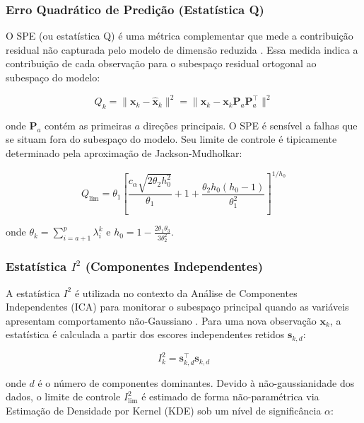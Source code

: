 \documentclass[journal]{IEEEtran}
\begin{document}
\subsubsection{Erro Quadrático de Predição (Estatística Q)}

O SPE (ou estatística Q) é uma métrica complementar que mede a contribuição residual não capturada pelo modelo de dimensão reduzida \cite{yin2012}. Essa medida indica a contribuição de cada observação para o subespaço residual ortogonal ao subespaço do modelo:

\begin{equation}
Q_k = \|\mathbf{x}_k - \hat{\mathbf{x}}_k\|^2 = \|\mathbf{x}_k - \mathbf{x}_k \mathbf{P}_a \mathbf{P}_a^\top\|^2
\label{eq:spe_statistic}
\end{equation}

onde $\mathbf{P}_a$ contém as primeiras $a$ direções principais. O SPE é sensível a falhas que se situam fora do subespaço do modelo. Seu limite de controle é tipicamente determinado pela aproximação de Jackson-Mudholkar:

\begin{equation}
Q_{\text{lim}} = \theta_1 \left[ \frac{c_\alpha \sqrt{2\theta_2 h_0^2}}{\theta_1} + 1 + \frac{\theta_2 h_0 (h_0-1)}{\theta_1^2} \right]^{1/h_0}
\label{eq:spe_limit}
\end{equation}

onde $\theta_k = \sum_{i=a+1}^p \lambda_i^k$ e $h_0 = 1 - \frac{2\theta_1 \theta_3}{3\theta_2^2}$.

\subsubsection{Estatística $I^2$ (Componentes Independentes)}
\label{subsubsection:i2_statistic}

A estatística $I^2$ é utilizada no contexto da Análise de Componentes Independentes (ICA) para monitorar o subespaço principal quando as variáveis apresentam comportamento não-Gaussiano \cite{lee2004}. Para uma nova observação $\mathbf{x}_k$, a estatística é calculada a partir dos escores independentes retidos $\mathbf{s}_{k,d}$:

\begin{equation}
I^2_k = \mathbf{s}_{k,d}^\top \mathbf{s}_{k,d}
\label{eq:i2_statistic}
\end{equation}

onde $d$ é o número de componentes dominantes. Devido à não-gaussianidade dos dados, o limite de controle $I^2_{\text{lim}}$ é estimado de forma não-paramétrica via Estimação de Densidade por Kernel (KDE) sob um nível de significância $\alpha$:
\end{document}
